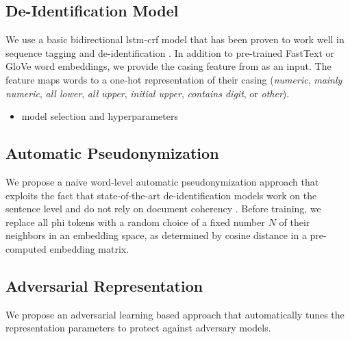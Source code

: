 \subsection{De-Identification Model}\label{sec:deidentification-model}
%
We use a basic bidirectional \ac{lstm}-\ac{crf} model that has been proven to work well in sequence tagging \citep{huang2015bidirectional,lample2016neural} and de-identification \citep{dernoncourt2017identification,liu2017identification}.
%
In addition to pre-trained FastText \citep{bojanowski2016enriching} or GloVe \citep{pennington2014glove} word embeddings, we provide the casing feature from \citet{reimers2017optimal} as an input.
%
The feature maps words to a one-hot representation of their casing (\textit{numeric}, \textit{mainly numeric}, \textit{all lower}, \textit{all upper}, \textit{initial upper}, \textit{contains digit}, or \textit{other}).

\begin{itemize}
    \item model selection and hyperparameters
\end{itemize}


\subsection{Automatic Pseudonymization}\label{sec:automatic-pseudonymization}
%
We propose a naive word-level automatic pseudonymization approach that exploits the fact that state-of-the-art de-identification models work on the sentence level and do not rely on document coherency \citep{liu2017identification,dernoncourt2017identification}.
%
Before training, we replace all \ac{phi} tokens with a random choice of a fixed number $N$ of their neighbors in an embedding space, as determined by cosine distance in a pre-computed embedding matrix.

\subsection{Adversarial Representation}\label{sec:adversarial-representation}
%
We propose an adversarial learning based approach that automatically tunes the representation parameters to protect against adversary models.

